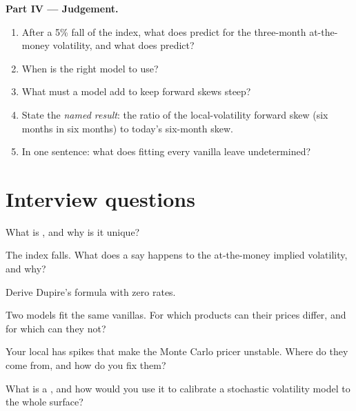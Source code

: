 \begin{problem}
\medskip\noindent\textbf{Part IV --- Judgement.}
\begin{enumerate}[resume]
\item After a 5\% fall of the index, what does  predict for the three-month at-the-money volatility,
and what does  predict?
\item When is  the right model to use?
\item What must a model add to keep forward skews steep?
\item State the \emph{named result}: the ratio of the local-volatility forward skew (six months in six months) to
today's six-month skew.
\item In one sentence: what does fitting every vanilla leave undetermined?
\end{enumerate}
\end{problem}

\section{Interview questions}

\begin{interviewq}\label{iq:dv:local-volatility:1}
What is , and why is it unique?
\end{interviewq}

\begin{interviewq}\label{iq:dv:local-volatility:2}
The index falls. What does a  say happens to the at-the-money implied volatility, and why?
\end{interviewq}

\begin{interviewq}\label{iq:dv:local-volatility:3}
Derive Dupire's formula with zero rates.
\end{interviewq}

\begin{interviewq}\label{iq:dv:local-volatility:4}
Two models fit the same vanillas. For which products can their prices differ, and for which can they not?
\end{interviewq}

\begin{interviewq}\label{iq:dv:local-volatility:5}
Your local  has spikes that make the Monte Carlo pricer unstable. Where do they come from, and
how do you fix them?
\end{interviewq}

\begin{interviewq}\label{iq:dv:local-volatility:6}
What is a , and how would you use it to calibrate a stochastic volatility model to the whole
surface?
\end{interviewq}

